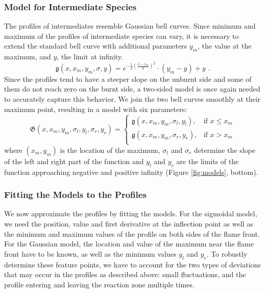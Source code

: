 \subsubsection{Model for Intermediate Species} %
\label{ssub:model_for_intermediate_species}
%
The profiles of intermediates resemble Gaussian bell curves. Since minimum and
maximum of the profiles of intermediate species can vary, it is necessary to
extend the standard bell curve with additional parameters $y_m$, the value at
the maximum, and $y$, the limit at infinity.
%
\begin{equation*}
	\mathfrak{g}(x, x_m, y_m, \sigma, y) 
		= e^{-\frac{1}{2}(\frac{x-x_m}{\sigma})^2}\cdot(y_m-y)+y \text{ .}
\end{equation*}
%
Since the profiles tend to have a steeper slope on the unburnt side and some of
them do not reach zero on the burnt side, a two-sided model is once again needed
to accurately capture this behavior. We join the two bell curves smoothly at
their maximum point, resulting in a model with six parameters:
%
\begin{equation*}
	\mathfrak{G}(x, x_m, y_m, \sigma_l, y_l, \sigma_r, y_r) =  
	\begin{cases}
		\mathfrak{g}(x, x_m, y_m, \sigma_l, y_l), & \text{if }  x \leq x_m\\
		\mathfrak{g}(x, x_m, y_m, \sigma_r, y_r), & \text{if }  x > x_m\\
	\end{cases}
\end{equation*}
%
where $(x_m, y_m)$ is the location of the maximum, $\sigma_l$ and $\sigma_r$
determine the slope of the left and right part of the function and $y_l$ and
$y_r$ are the limits of the function approaching negative and positive infinity
(Figure \ref{fig:models}, bottom).
%
% 	
%
%
\subsubsection{Fitting the Models to the Profiles} %
\label{ssub:fitting_the_models}
%
We now approximate the profiles by fitting the models. For the sigmoidal model,
we need the position, value and first derivative at the inflection point as well
as the minimum and maximum values of the profile on both sides of the flame
front. For the Gaussian model, the location and value of the maximum near the
flame front have to be known, as well as the minimum values $y_l$ and $y_r$. To
robustly determine these feature points, we have to account for the two types of
deviations that may occur in the profiles as described above: small
fluctuations, and the profile entering and leaving the reaction zone multiple
times.

